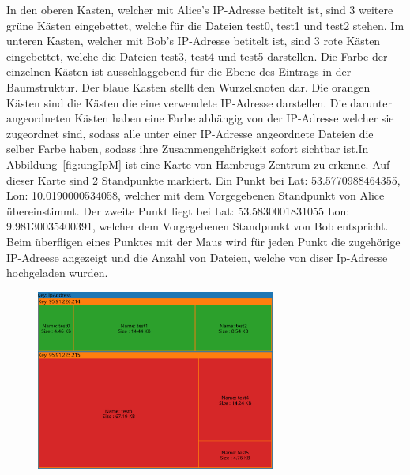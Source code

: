 \documentclass[
    fontsize=12pt,
    headings=small,
    parskip=half,           %
    bibliography=totoc,
    numbers=noenddot,       %
    open=any,               %
    ]{scrreprt}
\begin{document}
In den oberen Kasten, welcher mit Alice's IP-Adresse betitelt ist, sind 3 weitere grüne Kästen eingebettet, welche für die Dateien test0, test1 und test2 stehen.
Im unteren Kasten, welcher mit Bob's IP-Adresse betitelt ist, sind 3 rote Kästen eingebettet, welche die Dateien test3, test4 und test5 darstellen.
Die Farbe der einzelnen Kästen ist ausschlaggebend für die Ebene des Eintrags in der Baumstruktur.
Der blaue Kasten stellt den Wurzelknoten dar.
Die orangen Kästen sind die Kästen die eine verwendete IP-Adresse darstellen.
Die darunter angeordneten Kästen haben eine Farbe abhängig von der IP-Adresse welcher sie zugeordnet sind, sodass alle unter einer IP-Adresse angeordnete Dateien die selber Farbe haben, sodass ihre Zusammengehörigkeit sofort sichtbar ist.In Abbildung~\ref{fig:ungIpM} ist eine Karte von Hambrugs Zentrum zu erkenne.
Auf dieser Karte sind 2 Standpunkte markiert.
Ein Punkt bei Lat: 53.5770988464355, Lon: 10.0190000534058, welcher mit dem Vorgegebenen Standpunkt von Alice übereinstimmt.
Der zweite Punkt liegt bei Lat: 53.5830001831055 Lon: 9.98130035400391, welcher dem Vorgegebenen Standpunkt von Bob entspricht.
Beim überfligen eines Punktes mit der Maus wird für jeden Punkt die zugehörige IP-Adreese angezeigt und die Anzahl von Dateien, welche von diser Ip-Adresse hochgeladen wurden.

\begin{figure}[H]
\includegraphics[width=0.7\textwidth]{../pic/IP-Proxy-SetA-tree2.PNG}
\label{fig:ungIpTM}
\end{figure}
\end{document}
